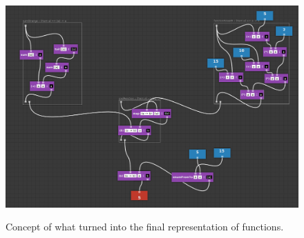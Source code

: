 \begin{figure}[p]
	\centering
	\includegraphics[scale=0.3]{Images/voorbeeldprogramma5.png}
	\label{fig:example-program-5}
	\caption{Concept of what turned into the final representation of functions.}
\end{figure}
